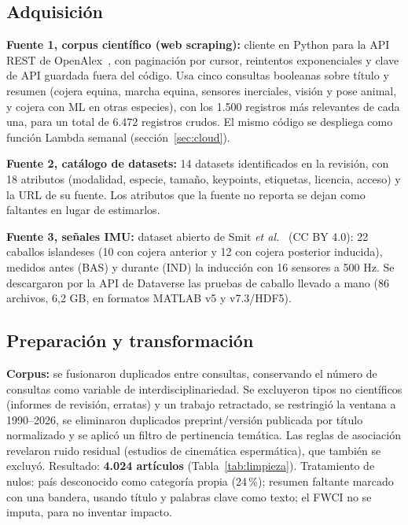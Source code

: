 \documentclass[conference,a4paper]{IEEEtran}
\begin{document}
\subsection{Adquisición}
\textbf{Fuente 1, corpus científico (web scraping):} cliente en Python para la API REST de OpenAlex~\cite{priem2022openalex}, con paginación por cursor, reintentos exponenciales y clave de API guardada fuera del código. Usa cinco consultas booleanas sobre título y resumen (cojera equina, marcha equina, sensores inerciales, visión y pose animal, y cojera con ML en otras especies), con los 1.500 registros más relevantes de cada una, para un total de 6.472 registros crudos. El mismo código se despliega como función Lambda semanal (sección~\ref{sec:cloud}).

\textbf{Fuente 2, catálogo de datasets:} 14 datasets identificados en la revisión, con 18 atributos (modalidad, especie, tamaño, keypoints, etiquetas, licencia, acceso) y la URL de su fuente. Los atributos que la fuente no reporta se dejan como faltantes en lugar de estimarlos.

\textbf{Fuente 3, señales IMU:} dataset abierto de Smit \emph{et al.}~\cite{smit2023dataset} (CC BY 4.0): 22 caballos islandeses (10 con cojera anterior y 12 con cojera posterior inducida), medidos antes (BAS) y durante (IND) la inducción con 16 sensores a 500 Hz. Se descargaron por la API de Dataverse las pruebas de caballo llevado a mano (86 archivos, 6,2 GB, en formatos MATLAB v5 y v7.3/HDF5).

\subsection{Preparación y transformación}
\textbf{Corpus:} se fusionaron duplicados entre consultas, conservando el número de consultas como variable de interdisciplinariedad. Se excluyeron tipos no científicos (informes de revisión, erratas) y un trabajo retractado, se restringió la ventana a 1990--2026, se eliminaron duplicados preprint/versión publicada por título normalizado y se aplicó un filtro de pertinencia temática. Las reglas de asociación revelaron ruido residual (estudios de cinemática espermática), que también se excluyó. Resultado: \textbf{4.024 artículos} (Tabla~\ref{tab:limpieza}). Tratamiento de nulos: país desconocido como categoría propia (24\,\%); resumen faltante marcado con una bandera, usando título y palabras clave como texto; el FWCI no se imputa, para no inventar impacto.
\end{document}
